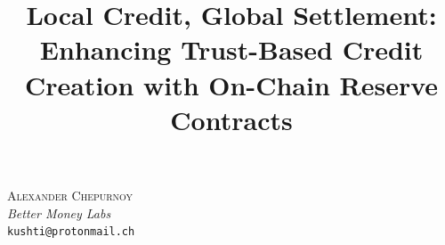 \documentclass{ifcolog}
\begin{document}
\title{Local Credit, Global Settlement: Enhancing Trust-Based Credit Creation with On-Chain Reserve Contracts}



\maketitle

\begin{center}
\textsc{Alexander Chepurnoy}\\
\textit{Better Money Labs}\\
\texttt{kushti@protonmail.ch}
\end{center}
\vspace{1em}
\end{document}
